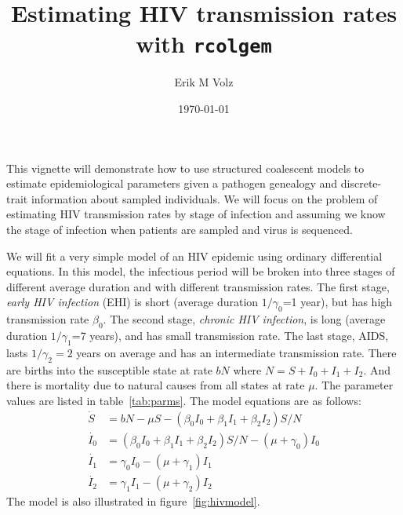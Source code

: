 \documentclass{article}
\begin{document}
\title{Estimating HIV transmission rates with \texttt{rcolgem}}
\author{Erik M Volz}
\date{\today}
\maketitle

This vignette will demonstrate how to use structured coalescent models\cite{volz2012complex} to estimate epidemiological parameters given a pathogen genealogy and discrete-trait information about sampled individuals. 
We will focus on the problem of estimating HIV transmission rates by stage of infection and assuming we know the stage of infection when patients are sampled and virus is sequenced. 

We will fit a very simple model of an HIV epidemic using ordinary differential equations. 
In this model, the infectious period will be broken into three stages of different average duration and with different transmission rates. 
The first stage, \emph{early HIV infection} (EHI) is short (average duration $1/\gamma_0$=1 year), but has high transmission rate $\beta_0$. 
The second stage, \emph{chronic HIV infection}, is long (average duration $1/\gamma_1$=7 years), and has small transmission rate. 
The last stage, AIDS, lasts $1/\gamma_2=2$ years on average and has an intermediate transmission rate.
There are births into the susceptible state at rate $b N$ where $N=S + I_0 + I_1 + I_2$. 
And there is mortality due to natural causes from all states at rate $\mu$. 
The parameter values are listed in table~\ref{tab:parms}. 
The model equations are as follows: 
\begin{align}
	\dot{S} &= b N - \mu S - (\beta_0 I_0 + \beta_1 I_1 + \beta_2 I_2) S / N  \\
	\dot{I_0} &= (\beta_0 I_0 + \beta_1 I_1 + \beta_2 I_2) S / N - (\mu + \gamma_0) I_0  \\
	\dot{I_1} &= \gamma_0 I_0 - (\mu + \gamma_1) I_1  \\
	\dot{I_2} &= \gamma_1 I_1 - (\mu + \gamma_2) I_2 
\end{align}
The model is also illustrated in figure~\ref{fig:hivmodel}.
\end{document}
